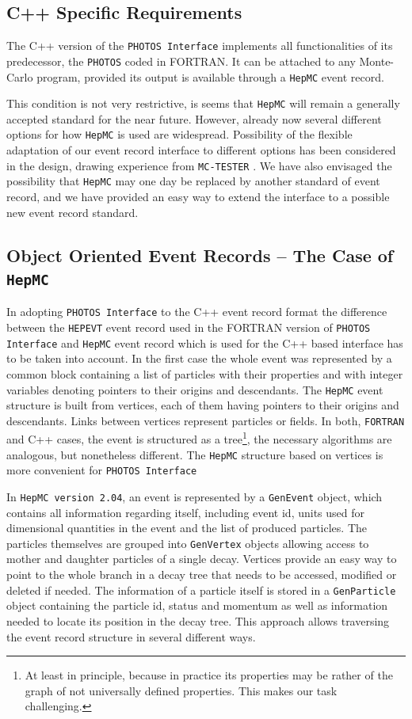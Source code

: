 \documentclass[]{Photos_interface_design}
\begin{document}
\subsection{C++ Specific Requirements}

The C++ version of the {\tt PHOTOS Interface} implements all functionalities
of its predecessor, the {\tt PHOTOS} coded in FORTRAN.
It can be attached to any Monte-Carlo program,
provided its output is available through a {\tt HepMC} \cite{Dobbs:2001ck} event record.

This condition is not very restrictive, is seems that {\tt HepMC} will
remain a generally accepted standard for the near future. However,
already now several different options for how {\tt HepMC} is used are
widespread. Possibility of the flexible  adaptation of our event record 
interface to different
options has been considered in the design,  drawing experience
from {\tt MC-TESTER} \cite{Golonka:2002rz,Davidson:2008ma}.
We have also
envisaged the possibility that {\tt HepMC} may one day be replaced by another
standard of event record, and we have provided an easy way to extend
the interface to a possible new event record standard.

\subsection{Object Oriented Event Records  -- The Case of {\tt HepMC}}
In adopting {\tt PHOTOS Interface} to the C++ event record format
 the difference between the {\tt HEPEVT} event record used in the FORTRAN
version of {\tt PHOTOS Interface} and  {\tt HepMC} event record  
which is used for the C++ based interface
has to be taken into account. 
In the first case the whole event was represented
by a common block containing a list of particles with their properties and
with integer 
variables denoting pointers to their origins and descendants.
 The {\tt HepMC} event structure
is built from vertices, each of them having pointers to their origins and descendants. Links between vertices represent particles or fields.
 In both, {\tt FORTRAN} and C++  
cases, the event is structured as 
a tree\footnote{At least in principle, because in practice its properties
may be rather of the graph of not universally defined properties.
This makes our task challenging.}, the necessary algorithms are  analogous, 
but nonetheless different. The {\tt HepMC} structure based on vertices is more
convenient for 
{\tt PHOTOS Interface}

In {\tt HepMC version 2.04}, an  event is represented by a {\tt GenEvent} object,
which contains all information regarding itself, including event id,
units used for dimensional quantities in the event and the list of produced particles. The particles
themselves are grouped into {\tt GenVertex} objects allowing access to mother
and daughter particles of a single decay. Vertices provide an easy way
to point to the whole branch in a decay tree that needs to be accessed,
modified or deleted if needed. The information of a particle  itself is stored
in a {\tt GenParticle} object containing the particle id, status and momentum
as well as information needed to locate its position in the decay tree.
This approach allows traversing the event record structure in several different
ways.
\end{document}
